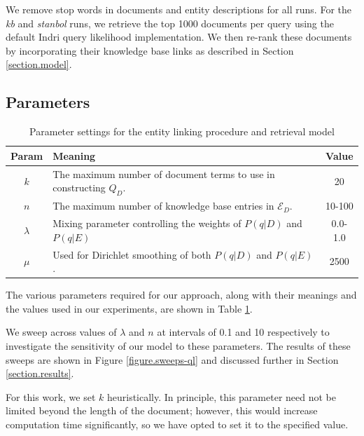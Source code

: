 \documentclass{sig-alternate}
\begin{document}
We remove stop words in documents and entity descriptions for all runs. For the \textit{kb} and \textit{stanbol} runs, we retrieve the top 1000 documents per query using the default Indri query likelihood implementation. We then re-rank these documents by incorporating their knowledge base links as described in Section \ref{section.model}.

\subsection{Parameters}\label{section.evaluation.parameters}

\begin{table}[htb]
\centering
\begin{tabular}{|c|p{}|c|} \hline
{\bf Param} & {\bf Meaning} & {\bf Value} \\ \hline
$k$ & The maximum number of document terms to use in constructing $Q_D$. & 20 \\ \hline
$n$ & The maximum number of knowledge base entries in $\mathcal{E}_D$. & 10-100 \\ \hline
$\lambda$ & Mixing parameter controlling the weights of $P(q|D)$ and $P(q|E)$ & 0.0-1.0 \\ \hline
$\mu$ & Used for Dirichlet smoothing of both $P(q|D)$ and $P(q|E)$. & 2500 \\ \hline
\end{tabular}
\caption{Parameter settings for the entity linking procedure and retrieval model}
\label{table.parameters}
\end{table}

The various parameters required for our approach, along with their meanings and the values used in our experiments, are shown in Table \ref{table.parameters}. 

We sweep across values of $\lambda$ and $n$ at intervals of 0.1 and 10 respectively to investigate the sensitivity of our model to these parameters. The results of these sweeps are shown in Figure \ref{figure.sweeps-ql} and discussed further in Section \ref{section.results}.

For this work, we set $k$ heuristically. In principle, this parameter need not be limited beyond the length of the document; however, this would increase computation time significantly, so we have opted to set it to the specified value.
\end{document}
